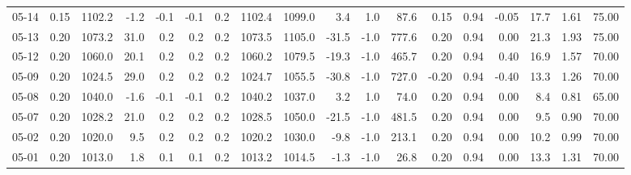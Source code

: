 \begin{threeparttable}
{\begin{tabular}{lrrrrrrrrrrrrrrrrr}
  05-14 &     0.15 & 1102.2 &              -1.2 &              -0.1 &               -0.1 &                0.2 & 1102.4 & 1099.0 &        3.4 &                      1.0 &                87.6 &       0.15 &      0.94 &          -0.05 &             17.7 &            1.61 &                  75.00 \\
  05-13 &     0.20 & 1073.2 &              31.0 &               0.2 &                0.2 &                0.2 & 1073.5 & 1105.0 &      -31.5 &                     -1.0 &               777.6 &       0.20 &      0.94 &           0.00 &             21.3 &            1.93 &                  75.00 \\
  05-12 &     0.20 & 1060.0 &              20.1 &               0.2 &                0.2 &                0.2 & 1060.2 & 1079.5 &      -19.3 &                     -1.0 &               465.7 &       0.20 &      0.94 &           0.40 &             16.9 &            1.57 &                  70.00 \\
  05-09 &     0.20 & 1024.5 &              29.0 &               0.2 &                0.2 &                0.2 & 1024.7 & 1055.5 &      -30.8 &                     -1.0 &               727.0 &      -0.20 &      0.94 &          -0.40 &             13.3 &            1.26 &                  70.00 \\
  05-08 &     0.20 & 1040.0 &              -1.6 &              -0.1 &               -0.1 &                0.2 & 1040.2 & 1037.0 &        3.2 &                      1.0 &                74.0 &       0.20 &      0.94 &           0.00 &              8.4 &            0.81 &                  65.00 \\
  05-07 &     0.20 & 1028.2 &              21.0 &               0.2 &                0.2 &                0.2 & 1028.5 & 1050.0 &      -21.5 &                     -1.0 &               481.5 &       0.20 &      0.94 &           0.00 &              9.5 &            0.90 &                  70.00 \\
  05-02 &     0.20 & 1020.0 &               9.5 &               0.2 &                0.2 &                0.2 & 1020.2 & 1030.0 &       -9.8 &                     -1.0 &               213.1 &       0.20 &      0.94 &           0.00 &             10.2 &            0.99 &                  70.00 \\
  05-01 &     0.20 & 1013.0 &               1.8 &               0.1 &                0.1 &                0.2 & 1013.2 & 1014.5 &       -1.3 &                     -1.0 &                26.8 &       0.20 &      0.94 &           0.00 &             13.3 &            1.31 &                  70.00 \\

\end{tabular}}
\end{threeparttable}

